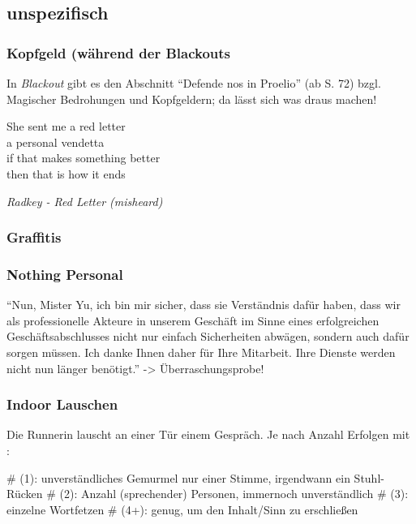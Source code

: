 \subsection{unspezifisch}

\subsubsection{Kopfgeld (während der Blackouts}
In \textit{Blackout} gibt es den Abschnitt ``Defende nos in Proelio'' (ab S. 72) bzgl. Magischer Bedrohungen und Kopfgeldern; da lässt sich was draus machen!



\epigraph{She sent me a red letter\\ a personal vendetta\\ if that makes something better \\ then that is how it ends}{\textit{Radkey - Red Letter (misheard)}}


\subsubsection{Graffitis}






\subsubsection{Nothing Personal}
``Nun, Mister Yu, ich bin mir sicher, dass sie Verständnis dafür haben, dass wir als professionelle Akteure in unserem Geschäft im Sinne eines erfolgreichen Geschäftsabschlusses nicht nur einfach Sicherheiten abwägen, sondern auch dafür sorgen müssen. Ich danke Ihnen daher für Ihre Mitarbeit. Ihre Dienste werden nicht nun länger benötigt.'' -> Überraschungsprobe!

\subsubsection{Indoor Lauschen}

Die Runnerin lauscht an einer Tür einem Gespräch. Je nach Anzahl Erfolgen mit :

\begin{easylist}
    # (1): unverständliches Gemurmel nur einer Stimme, irgendwann ein Stuhl-Rücken
    # (2): Anzahl (sprechender) Personen, immernoch unverständlich
    # (3): einzelne Wortfetzen
    # (4+): genug, um den Inhalt/Sinn zu erschließen
\end{easylist}

